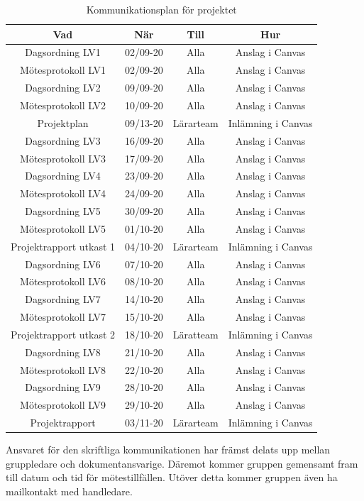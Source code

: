 \documentclass[a4paper]{article}
\begin{document}
\begin{table}[H]
    \centering
    \begin{tabular}{ |c|c|c|c| }\hline
     Vad & När & Till & Hur \\\hline
     Dagsordning LV1 & 02/09-20 & Alla & Anslag i Canvas \\\hline
     Mötesprotokoll LV1 & 02/09-20 & Alla & Anslag i Canvas \\\hline
     Dagsordning LV2 & 09/09-20 & Alla & Anslag i Canvas \\\hline
     Mötesprotokoll LV2 & 10/09-20 & Alla & Anslag i Canvas \\\hline
     Projektplan & 09/13-20 & Lärarteam & Inlämning i Canvas\\\hline 
     Dagsordning LV3 & 16/09-20 & Alla & Anslag i Canvas \\\hline
     Mötesprotokoll LV3 & 17/09-20 & Alla & Anslag i Canvas \\\hline
     Dagsordning LV4 & 23/09-20 & Alla & Anslag i Canvas \\\hline
     Mötesprotokoll LV4 & 24/09-20 & Alla & Anslag i Canvas \\\hline
     Dagsordning LV5 & 30/09-20 & Alla & Anslag i Canvas \\\hline
     Mötesprotokoll LV5 & 01/10-20 & Alla & Anslag i Canvas \\\hline
     Projektrapport utkast 1 & 04/10-20 & Lärarteam & Inlämning i Canvas \\\hline
     Dagsordning LV6 & 07/10-20 & Alla & Anslag i Canvas \\\hline
     Mötesprotokoll LV6 & 08/10-20 & Alla & Anslag i Canvas \\\hline
     Dagsordning LV7 & 14/10-20 & Alla & Anslag i Canvas \\\hline
     Mötesprotokoll LV7 & 15/10-20 & Alla & Anslag i Canvas \\\hline
     Projektrapport utkast 2 & 18/10-20 & Läratteam & Inlämning i Canvas \\\hline
     Dagsordning LV8 & 21/10-20 & Alla & Anslag i Canvas \\\hline
     Mötesprotokoll LV8 & 22/10-20 & Alla & Anslag i Canvas \\\hline
     Dagsordning LV9 & 28/10-20 & Alla & Anslag i Canvas \\\hline
     Mötesprotokoll LV9 & 29/10-20 & Alla & Anslag i Canvas \\\hline
     Projektrapport & 03/11-20 & Lärarteam & Inlämning i Canvas \\\hline
    \end{tabular}
    \caption{Kommunikationsplan för projektet}
    \label{table:kommunikationsplan}
\end{table}
Ansvaret för den skriftliga kommunikationen har främst delats upp mellan gruppledare och dokumentansvarige. Däremot kommer gruppen gemensamt fram till datum och tid för mötestillfällen. Utöver detta kommer gruppen även ha mailkontakt med handledare. 
\end{document}
